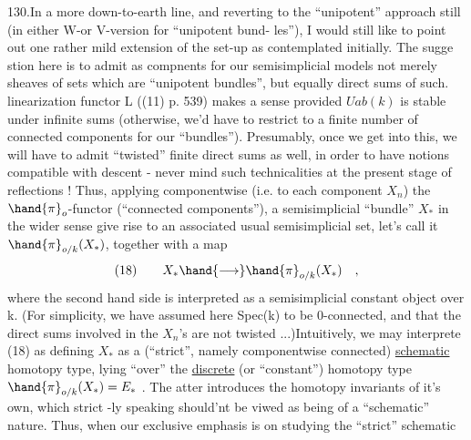 
130.\qquad In a more down-to-earth line,  and  reverting to the
``unipotent'' approach still (in either W-or V-version for ``unipotent bund-%
les''),  I would still like to point out one rather mild extension of the
set-up as contemplated initially.  The sugge stion here is to admit as
compnents for our semisimplicial models not merely sheaves of sets which
are ``unipotent bundles'',  but equally  direct sums of such.  
   linearization functor L
((11) p. 539)   makes a sense\hand{,}   provided $Uab(k)$ is stable
under infinite sums (otherwise, we'd have to restrict to a finite number
of connected components for our ``bundles'').  Presumably,  once we get
into this,  we will have to admit ``twisted'' finite direct sums as well,
in order to have  notions compatible with descent  - never mind such
technicalities at the present stage of reflections !  Thus,  applying
componentwise (i.e. to each component $X_n$) the $\hand{\pi}_o$-functor (``connected
components''),  a semisimplicial ``bundle'' $X_{*}$ in the wider sense give rise
to an associated  usual semisimplicial set,  let's call it $\hand{\pi}_{o/k}(X_{*})$,
together with a map
\[ (18) \qquad X_{*} \hand{\longrightarrow} \hand{\pi}_{o/k}(X_{*}) \quad , \]
where the second hand side is interpreted as a semisimplicial constant
object over k.  (For simplicity,  we have assumed here Spec(k) to be
0-connected,  and that the direct sums involved in the $X_n$'s  are not
twisted ...)Intuitively,  we may interprete (18) as defining $X_{*}$ as a
(``strict'', namely componentwise connected) \uline{schematic} homotopy type,
lying ``over'' the \uline{discrete} (or ``constant'') homotopy type $\hand{\pi}_{o/k}(X_{*}) = E_{*}$ .
The atter introduces the homotopy invariants of it's own,  which strict
-ly speaking should'nt be viwed as  being of a ``schematic'' nature.  Thus,
when our exclusive emphasis is on studying the  ``strict'' schematic
